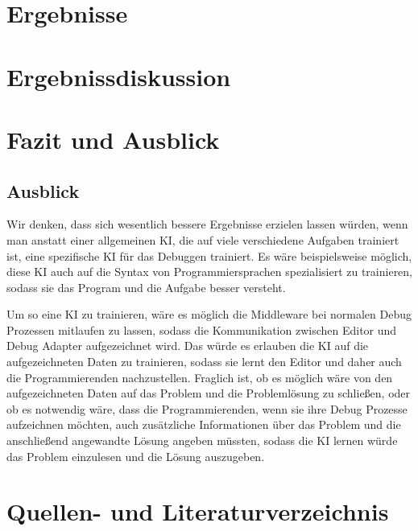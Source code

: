 \documentclass[a4paper,12pt,ngerman]{scrartcl}
\begin{document}
\section{Ergebnisse}

\section{Ergebnissdiskussion}

\section{Fazit und Ausblick}

\subsection{Ausblick}

Wir denken, dass sich wesentlich bessere Ergebnisse erzielen lassen würden, wenn man anstatt einer allgemeinen KI, die auf viele verschiedene Aufgaben trainiert ist, eine spezifische KI für das Debuggen trainiert. Es wäre beispielsweise möglich, diese KI auch auf die Syntax von Programmiersprachen spezialisiert zu trainieren, sodass sie das Program und die Aufgabe besser versteht.

Um so eine KI zu trainieren, wäre es möglich die Middleware bei normalen Debug Prozessen mitlaufen zu lassen, sodass die Kommunikation zwischen Editor und Debug Adapter aufgezeichnet wird. Das würde es erlauben die KI auf die aufgezeichneten Daten zu trainieren, sodass sie lernt den Editor und daher auch die Programmierenden nachzustellen. Fraglich ist, ob es möglich wäre von den aufgezeichneten Daten auf das Problem und die Problemlösung zu schließen, oder ob es notwendig wäre, dass die Programmierenden, wenn sie ihre Debug Prozesse aufzeichnen möchten, auch zusätzliche Informationen über das Problem und die anschließend angewandte Lösung angeben müssten, sodass die KI lernen würde das Problem einzulesen und die Lösung auszugeben.

\section{Quellen- und Literaturverzeichnis}
\end{document}
